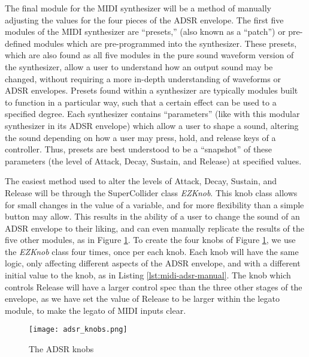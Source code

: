 The final module for the MIDI synthesizer will be a method of manually adjusting the values for the four pieces of the ADSR envelope. The first five modules of the MIDI synthesizer are ``presets,'' (also known as a ``patch'') or pre-defined modules which are pre-programmed into the synthesizer. These presets, which are also found as all five modules in the pure sound waveform version of the synthesizer, allow a user to understand how an output sound may be changed, without requiring a more in-depth understanding of waveforms or ADSR envelopes. Presets found within a synthesizer are typically modules built to function in a particular way, such that a certain effect can be used to a specified degree. Each synthesizer contains ``parameters'' (like with this modular synthesizer in its ADSR envelope) which allow a user to shape a sound, altering the sound depending on how a user may press, hold, and release keys of a controller. Thus, presets are best understood to be a ``snapshot'' of these parameters (the level of Attack, Decay, Sustain, and Release) at specified values.

The easiest method used to alter the levels of Attack, Decay, Sustain, and Release will be through the SuperCollider class \textit{EZKnob}. This knob class allows for small changes in the value of a variable, and for more flexibility than a simple button may allow. This results in the ability of a user to change the sound of an ADSR envelope to their liking, and can even manually replicate the results of the five other modules, as in Figure \ref{fig:adsr-knobs}. To create the four knobs of Figure \ref{fig:adsr-knobs}, we use the \textit{EZKnob} class four times, once per each knob. Each knob will have the same logic, only affecting different aspects of the ADSR envelope, and with a different initial value to the knob, as in Listing \ref{lst:midi-adsr-manual}. The knob which controls Release will have a larger control spec than the three other stages of the envelope, as we have set the value of Release to be larger within the legato module, to make the legato of MIDI inputs clear.

\begin{figure}[h]
  \centering
  \texttt{[image: adsr\_knobs.png]}
  \caption{The ADSR knobs}
  \label{fig:adsr-knobs}
\end{figure}


